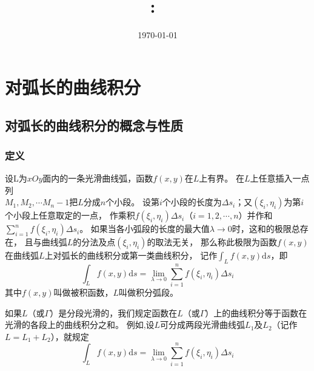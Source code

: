 \documentclass[12pt, a4paper]{article}
\title{
    \vspace{2in}
    \textmd{\textbf{\hmwkClass:\ \hmwkTitle}}\\
    \vspace{0.4in}
    \large{\textit{\myUniversiy}}
    \vspace{3in}
}
\author{\hmwkAuthorName}
\date{\today}
\numberwithin{equation}{section}
\newcommand{\rmd}{\mathrm{d}}
\begin{document}
\maketitle

\pagebreak


\tableofcontents

\pagebreak


\pagebreak

\section{对弧长的曲线积分}

\subsection{对弧长的曲线积分的概念与性质}

\subsubsection{定义}

    设L为\(xOy\)面内的一条光滑曲线弧，函数\(f\left(x,y\right)\)在\(L\)上有界。
    在\(L\)上任意插入一点列\\\(M_1, M_2, \cdots M_n-1\)把\(L\)分成\(n\)个小段。
    设第\(i\)个小段的长度为\(\Delta s_i\)；又\(\left(\xi_i, \eta_i\right)\)为第\(i\)个小段上任意取定的一点，
    作乘积\(f\left(\xi_i, \eta_i\right) \Delta s_i\)（\(i=1,2,\cdots,n\)）并作和\(\sum_{i=1}^{n}f\left(\xi_i, \eta_i\right) \Delta s_i\)。
    如果当各小弧段的长度的最大值\(\lambda \rightarrow 0\)时，这和的极限总存在，
    且与曲线弧\(L\)的分法及点\(\left(\xi_i, \eta_i\right) \)的取法无关，
    那么称此极限为函数\(f\left(x,y\right)\)在曲线弧\(L\)上对弧长的曲线积分或第一类曲线积分，
    记作\({\displaystyle \int_{L} f\left(x,y\right) \rmd s}\)，即
    \[\int_L f(x, y) \mathrm{d} s=\lim _{\lambda \rightarrow 0} \sum_{i=1}^n f\left(\xi_i, \eta_i\right) \Delta s_i\]
    其中\(f\left(x,y\right)\)叫做被积函数，\(L\)叫做积分弧段。

    如果\(L\)（或\(\varGamma\)）是分段光滑的，我们规定函数在\(L\)（或\(\varGamma\)）上的曲线积分等于函数在光滑的各段上的曲线积分之和。
    例如,设\(L\)可分成两段光滑曲线弧\(L_1\)及\(L_2\)（记作\(L=L_1+L_2\)），就规定
    \[\int_L f(x, y) \mathrm{d} s=\lim _{\lambda \rightarrow 0} \sum_{i=1}^n f\left(\xi_i, \eta_i\right) \Delta s_i\]
\end{document}

